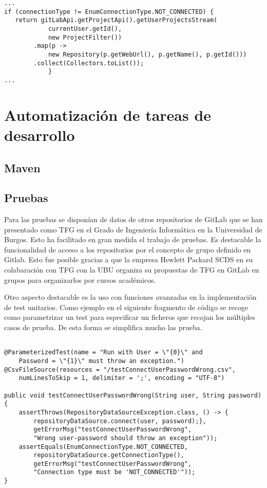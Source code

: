 {\tiny 
\begin{lstlisting}
...
if (connectionType != EnumConnectionType.NOT_CONNECTED) {
   return gitLabApi.getProjectApi().getUserProjectsStream(
   			currentUser.getId(),
   			new ProjectFilter())
		.map(p -> 
			new Repository(p.getWebUrl(), p.getName(), p.getId()))
		.collect(Collectors.toList());
			}
...
\end{lstlisting}
}

\section{Automatización de tareas de desarrollo}
\subsection{Maven}
\subsection{Pruebas}
Para las pruebas se disponían de datos de otros repositorios de GitLab que se han presentado como TFG en el Grado de Ingeniería Informática en la 
Universidad de Burgos. Esto ha facilitado en gran medida el trabajo de pruebas. 
Es destacable la funcionalidad de acceso a los repositorios por el concepto de grupo definido en Gitlab. Esto fue posible gracias a que la empresa Hewlett Packard SCDS en su colabaración con TFG con la UBU organiza su propuestas de TFG en GitLab en grupos para organizarlos por cursos académicos.

Otro aspecto destacable es la uso con funciones avanzadas en la implementación de test unitarios. 
Como ejemplo en el siguiente fragmento de código se recoge como parametrizar un test para especificar un ficheros que recojan los múltiples casos de prueba.
De esta forma se simplifica mucho las prueba.


{\tiny 
\begin{lstlisting}

@ParameterizedTest(name = "Run with User = \"{0}\" and 
	Password = \"{1}\" must throw an exception.")
@CsvFileSource(resources = "/testConnectUserPasswordWrong.csv", 
	numLinesToSkip = 1, delimiter = ';', encoding = "UTF-8")
						
public void testConnectUserPasswordWrong(String user, String password){
	assertThrows(RepositoryDataSourceException.class, () -> {
		repositoryDataSource.connect(user, password);},
		getErrorMsg("testConnectUserPasswordWrong", 
		"Wrong user-password should throw an exception"));
	assertEquals(EnumConnectionType.NOT_CONNECTED, 
		repositoryDataSource.getConnectionType(),
		getErrorMsg("testConnectUserPasswordWrong", 
		"Connection type must be 'NOT_CONNECTED'"));
}
\end{lstlisting}
}

